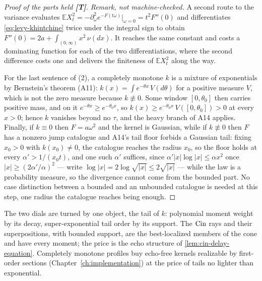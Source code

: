 \begin{proof}[Proof of the parts held \textbf{[T]}]
\emph{Remark, not machine-checked.} A second route to the variance evaluates
$\mathbb{E}X_t^2 = -\partial_\omega^2 e^{-F(t\omega)}|_{\omega = 0} = t^2F''(0)$ and
differentiates \ref{eq:levy-khintchine} twice under the integral sign to obtain
$F''(0) = 2a + \int_{(0,\infty)}x^2\,\nu(dx)$. It reaches the same constant and costs a
dominating function for each of the two differentiations, where the second difference costs one
and delivers the finiteness of $\mathbb{E}X_t^2$ along the way.

For the last
sentence of (2), a completely monotone $k$ is a mixture of exponentials by Bernstein's theorem
(A11): $k(x) = \int e^{-\theta x}\,V(d\theta)$ for a positive measure $V$, which is not the zero
measure because $k \not\equiv 0$. Some window $[0,\theta_0]$ then carries positive mass, and on it
$e^{-\theta x} \ge e^{-\theta_0x}$, so $k(x) \ge e^{-\theta_0x}\,V([0,\theta_0]) > 0$ at every
$x > 0$; hence $k$ vanishes beyond no $\tau$, and the heavy branch of A14 applies. Finally, if $k \equiv 0$
then $F = a\omega^2$ and the kernel is Gaussian, while if $k \not\equiv 0$ then $F$ has a
nonzero jump catalogue and A14's tail floor forbids a Gaussian tail: fixing $x_0 > 0$ with
$k(x_0) \ne 0$, the catalogue reaches the radius $x_0$, so the floor holds at every
$\alpha' > 1/(x_0t)$, and one such $\alpha'$ suffices, since
$\alpha'|x|\log|x| \le \alpha x^2$ once $|x| \ge (2\alpha'/\alpha)^2$ --- write
$\log|x| = 2\log\sqrt{|x|} \le 2\sqrt{|x|}$ --- while the law is a probability measure, so the
divergence cannot come from the bounded part. No case distinction between a bounded and an
unbounded catalogue is needed at this step, one radius the catalogue reaches being enough.
\end{proof}

The two dials are turned by one object, the tail of $k$: polynomial moment weight by its decay,
super-exponential tail order by its support. The $\operatorname{Cin}$ rays and their superpositions, with
bounded support, are the best-localized members of the cone and have every moment; the price is
the echo structure of \ref{lem:cin-delay-equation}. Completely monotone profiles buy echo-free
kernels realizable by first-order sections (Chapter~\ref{ch:implementation}) at the price of
tails no lighter than exponential.


